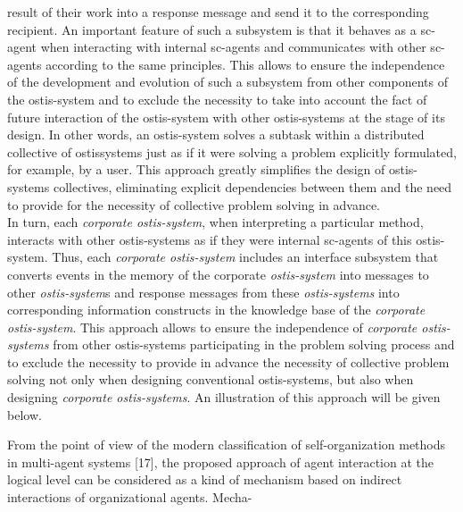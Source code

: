 \documentclass[12pt, a4paper]{article}
\begin{document}
\begin{multicols}{2}
\begin{itemize}
result of their work into a response message and
send it to the corresponding recipient. An important
feature of such a subsystem is that it behaves as
a sc-agent when interacting with internal sc-agents
and communicates with other sc-agents according
to the same principles. This allows to ensure the
independence of the development and evolution of
such a subsystem from other components of the
ostis-system and to exclude the necessity to take
into account the fact of future interaction of the
ostis-system with other ostis-systems at the stage of
its design. In other words, an ostis-system solves
a subtask within a distributed collective of ostissystems just as if it were solving a problem explicitly
formulated, for example, by a user. This approach
greatly simplifies the design of ostis-systems collectives, eliminating explicit dependencies between
them and the need to provide for the necessity of
collective problem solving in advance.\\
In turn, each \textit{corporate ostis-system}, when interpreting a particular method, interacts with other
ostis-systems as if they were internal sc-agents of
this ostis-system. Thus, each \textit{corporate ostis-system}
includes an interface subsystem that converts events
in the memory of the corporate \textit{ostis-system} into
messages to other \textit{ostis-system}s and response messages from these \textit{ostis-systems} into corresponding
information constructs in the knowledge base of
the \textit{corporate ostis-system}. This approach allows to
ensure the independence of \textit{corporate ostis-systems}
from other ostis-systems participating in the problem solving process and to exclude the necessity to
provide in advance the necessity of collective problem solving not only when designing conventional
ostis-systems, but also when designing \textit{corporate
ostis-systems}. An illustration of this approach will
be given below.
\end{itemize}\par
From the point of view of the modern classification
of self-organization methods in multi-agent systems [17],
the proposed approach of agent interaction at the logical
level can be considered as a kind of mechanism based
on indirect interactions of organizational agents. Mecha-

\end{multicols}
\end{document}
